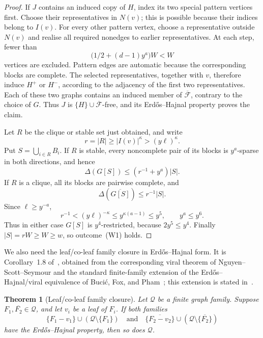 \documentclass[11pt]{article}
\numberwithin{equation}{section}
\theoremstyle{plain}
\newtheorem{theorem}{Theorem}[section]
\theoremstyle{definition}
\begin{document}
\begin{proof}
If $J$ contains an induced copy of $H$, index its two special pattern
vertices first.  Choose their representatives in $N(v)$; this is
possible because their indices belong to $I(v)$.  For every other
pattern vertex, choose a representative outside $N(v)$ and realise all
required nonedges to earlier representatives.  At each step, fewer
than
\[
                 \bigl(1/2+(d-1)y^a\bigr)W<W
\]
vertices are excluded.  Pattern edges are automatic because the
corresponding blocks are complete.  The selected representatives,
together with $v$, therefore induce $H^+$ or $H^-$, according to the
adjacency of the first two representatives.  Each of these two graphs
contains an induced member of $\overline{\mathcal F}$, contrary to the
choice of $G$.  Thus $J$ is
$\{H\}\cup\overline{\mathcal F}$-free, and its Erd\H{o}s--Hajnal
property proves the claim.

Let $R$ be the clique or stable set just obtained, and write
\[
                    r=|R|\geq |I(v)|^\kappa>(y\ell)^\kappa.
\]
Put $S=\bigcup_{i\in R}B_i$.  If $R$ is stable, every noncomplete
pair of its blocks is $y^a$-sparse in both directions, and hence
\[
             \Delta(G[S])\leq(r^{-1}+y^a)|S|.
\]
If $R$ is a clique, all its blocks are pairwise complete, and
\[
             \Delta(\overline{G[S]})\leq r^{-1}|S|.
\]
Since $\ell\geq y^{-a}$,
\[
 r^{-1}< (y\ell)^{-\kappa}
       \leq y^{\kappa(a-1)}\leq y^5,
 \qquad y^a\leq y^6.
\]
Thus in either case $G[S]$ is $y^4$-restricted, because
$2y^5\leq y^4$.  Finally $|S|=rW\geq W\geq w$, so outcome~(W1) holds.
\end{proof}

We also need the leaf/co-leaf family closure in Erd\H{o}s--Hajnal form.  It is
Corollary~1.8 of~\cite{HuangJuZhou2026}, obtained from the corresponding
viral theorem of Nguyen--Scott--Seymour
\cite[Theorem~7.8]{NguyenScottSeymourDensityIV} and the standard
finite-family extension of the Erd\H{o}s--Hajnal/viral equivalence of
Buci\'c, Fox, and Pham~\cite[Theorem~4]{BucicFoxPham2024}; this extension
is stated in~\cite[Theorem~1.3]{HuangJuZhou2026}.

\begin{theorem}[Leaf/co-leaf family closure]
\label{thm:leaf-coleaf-closure}
Let $\mathcal Q$ be a finite graph family.  Suppose
$F_1,\overline{F_2}\in\mathcal Q$, and let $v_i$ be a leaf of $F_i$.
If both families
\[
 \{F_1-v_1\}\cup(\mathcal Q\setminus\{F_1\})
 \quad\text{and}\quad
 \{\overline{F_2-v_2}\}\cup
       (\mathcal Q\setminus\{\overline{F_2}\})
\]
have the Erd\H{o}s--Hajnal property, then so does $\mathcal Q$.
\end{theorem}
\end{document}
